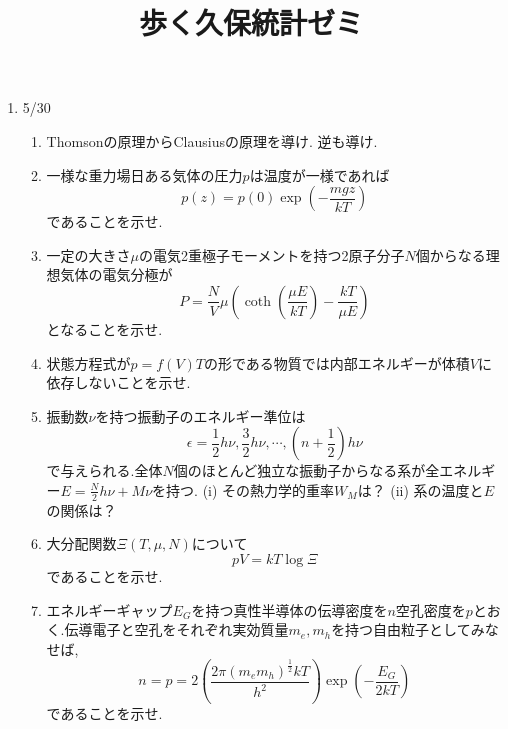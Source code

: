 \documentclass[11pt,a4paper]{jarticle}
\title{歩く久保統計ゼミ}
\author{}
\date{}
\begin{document}
\maketitle
\begin{enumerate}
    \item 5/30
    \begin{enumerate}
        \item Thomsonの原理からClausiusの原理を導け. 逆も導け.
        \item 一様な重力場日ある気体の圧力$p$は温度が一様であれば
        \begin{equation}
            p(z)=p(0)\exp(-\frac{mgz}{kT})
        \end{equation}
        であることを示せ.
        \item 一定の大きさ$\mu$の電気2重極子モーメントを持つ2原子分子$N$個からなる理想気体の電気分極が
        \begin{equation*}
            P=\frac{N}{V}\mu(\coth(\frac{\mu E}{kT})-\frac{kT}{\mu E})
        \end{equation*}
        となることを示せ.
        \item 状態方程式が$p=f(V)T$の形である物質では内部エネルギーが体積$V$に依存しないことを示せ.
        \item 振動数$\nu$を持つ振動子のエネルギー準位は
        \begin{equation*}
            \epsilon = \frac{1}{2}h\nu, \frac{3}{2}h\nu, \cdots ,(n+\frac{1}{2})h\nu
        \end{equation*}
        で与えられる.全体$N$個のほとんど独立な振動子からなる系が全エネルギー$E=\frac{N}{2}h\nu+M\nu$を持つ.
        (i) その熱力学的重率$W_M$は？
        (ii) 系の温度と$E$の関係は？
        \item 大分配関数$\Xi(T,\mu, N)$について
        \begin{equation*}
            pV=kT\log\Xi
        \end{equation*}
        であることを示せ.
        \item エネルギーギャップ$E_G$を持つ真性半導体の伝導密度を$n$空孔密度を$p$とおく.伝導電子と空孔をそれぞれ実効質量$m_e, m_h$を持つ自由粒子としてみなせば,
        \begin{equation*}
            n=p=2(\frac{2\pi(m_em_h)^{\frac{1}{2}}kT}{h^2})\exp(-\frac{E_G}{2kT})
        \end{equation*}
        であることを示せ.
    \end{enumerate}
\end{enumerate}
\end{document}
